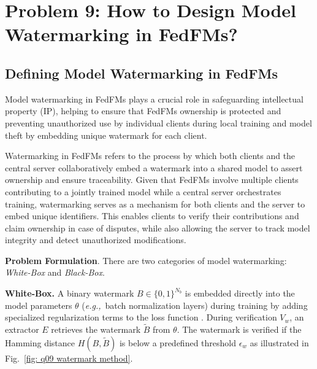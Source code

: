\section{Problem 9: How to Design Model Watermarking in FedFMs?}

\newcommand{\et}{\textit{et al.}}
\newcommand{\eg}{\textit{e.g.,}}
\newcommand{\ie}{\textit{i.e.,}}
\newcommand{\eq}{Eq.}
\newcommand{\fig}{Fig.}
\newcommand{\tab}{Tab.}
\newcommand{\s}{Sec.}
\newcommand{\alg}{Alg.}

\subsection{Defining Model Watermarking in FedFMs}




Model watermarking in FedFMs plays a crucial role in safeguarding intellectual property (IP), helping to ensure that FedFMs ownership is protected and preventing unauthorized use by individual clients during local training and model theft by embedding unique watermark for each client.

Watermarking in FedFMs refers to the process by which both clients and the central server collaboratively embed a watermark into a shared model to assert ownership and ensure traceability. Given that FedFMs involve multiple clients contributing to a jointly trained model while a central server orchestrates training, watermarking serves as a mechanism for both clients and the server to embed unique identifiers. This enables clients to verify their contributions and claim ownership in case of disputes, while also allowing the server to track model integrity and detect unauthorized modifications.



\textbf{Problem Formulation}. There are two categories of model watermarking:  \textit{White-Box} and \textit{Black-Box}.



\textbf{White-Box.} A binary watermark \(B \in \{0,1\}^{N_b}\) is embedded directly into the model parameters \(\theta\) (\eg~batch normalization layers) during training by adding specialized regularization terms to the loss function \cite{li2022fedipr}. During verification \(V_w\), an extractor \(E\) retrieves the watermark \(\tilde{B}\) from \(\theta\). The watermark is verified if the Hamming distance \(H(B, \tilde{B})\) is below a predefined threshold \(\epsilon_w\) as illustrated in \fig~\ref{fig: q09 watermark method}.



